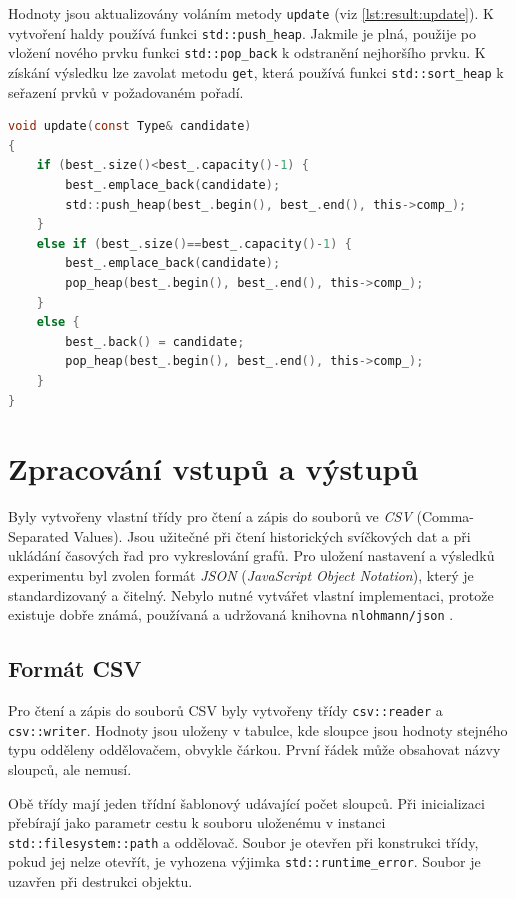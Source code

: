 Hodnoty jsou aktualizovány voláním metody \texttt{update} (viz \ref{lst:result:update}).
K vytvoření haldy používá funkci \texttt{std::push\_heap}.
Jakmile je plná, použije po vložení nového prvku funkci \texttt{std::pop\_back} k odstranění nejhoršího prvku.
K získání výsledku lze zavolat metodu \texttt{get}, která používá funkci \texttt{std::sort\_heap} k seřazení prvků v požadovaném pořadí.

\begin{lstlisting}[caption={~Implementace metody \texttt{update} třídy \texttt{enumerative\_result}},label={lst:result:update},captionpos=t,abovecaptionskip=-\medskipamount,belowcaptionskip=\medskipamount,language=C]
void update(const Type& candidate)
{
    if (best_.size()<best_.capacity()-1) {
        best_.emplace_back(candidate);
        std::push_heap(best_.begin(), best_.end(), this->comp_);
    }
    else if (best_.size()==best_.capacity()-1) {
        best_.emplace_back(candidate);
        pop_heap(best_.begin(), best_.end(), this->comp_);
    }
    else {
        best_.back() = candidate;
        pop_heap(best_.begin(), best_.end(), this->comp_);
    }
}
\end{lstlisting}

\chapter{Zpracování vstupů a výstupů}
Byly vytvořeny vlastní třídy pro čtení a zápis do souborů ve \textit{CSV} (Comma-Separated Values).
Jsou užitečné při čtení historických svíčkových dat a při ukládání časových řad pro vykreslování grafů.
Pro uložení nastavení a výsledků experimentu byl zvolen formát \textit{JSON} (\textit{JavaScript Object Notation}), který je standardizovaný a čitelný.
Nebylo nutné vytvářet vlastní implementaci, protože existuje dobře známá, používaná a udržovaná knihovna \texttt{nlohmann/json} \cite{lohmann}.

\section{Formát CSV}
Pro čtení a zápis do souborů CSV byly vytvořeny třídy \texttt{csv::reader} a \texttt{csv::writer}.
Hodnoty jsou uloženy v tabulce, kde sloupce jsou hodnoty stejného typu odděleny oddělovačem, obvykle čárkou.
První řádek může obsahovat názvy sloupců, ale nemusí.

Obě třídy mají jeden třídní šablonový udávající počet sloupců.
Při inicializaci přebírají jako parametr cestu k souboru uloženému v instanci \texttt{std::filesystem::path} a oddělovač.
Soubor je otevřen při konstrukci třídy, pokud jej nelze otevřít, je vyhozena výjimka \texttt{std::runtime\_error}.
Soubor je uzavřen při destrukci objektu.

